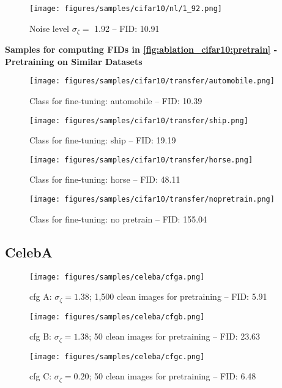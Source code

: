 \begin{figure}[h!]
    \centering
    \texttt{[image: figures/samples/cifar10/nl/1\_92.png]}
    \caption{Noise level $\sigma_\zeta = $ 1.92 -- FID: 10.91}
\end{figure}

\FloatBarrier

\textbf{Samples for computing FIDs in \cref{fig:ablation_cifar10:pretrain} - Pretraining on Similar Datasets}

\begin{figure}[h!]
    \centering
    \texttt{[image: figures/samples/cifar10/transfer/automobile.png]}
    \caption{Class for fine-tuning: automobile -- FID: 10.39}
\end{figure}

\begin{figure}[h!]
    \centering
    \texttt{[image: figures/samples/cifar10/transfer/ship.png]}
    \caption{Class for fine-tuning: ship -- FID: 19.19}
\end{figure}

\begin{figure}[h!]
    \centering
    \texttt{[image: figures/samples/cifar10/transfer/horse.png]}
    \caption{Class for fine-tuning: horse -- FID: 48.11}
\end{figure}
\newpage\begin{figure}[h!]
    \centering
    \texttt{[image: figures/samples/cifar10/transfer/nopretrain.png]}
    \caption{Class for fine-tuning: no pretrain -- FID: 155.04}
\end{figure}


\subsection{CelebA}

\begin{figure}[h!]
    \centering
    \texttt{[image: figures/samples/celeba/cfga.png]}
   \caption{cfg A: $\sigma_\zeta = 1.38$; 1,500 clean images for pretraining -- FID: 5.91}
\end{figure}

\begin{figure}[h!]
    \centering
    \texttt{[image: figures/samples/celeba/cfgb.png]}
   \caption{cfg B: $\sigma_\zeta = 1.38$; 50 clean images for pretraining -- FID: 23.63}
\end{figure}

\FloatBarrier

\begin{figure}[h!]
    \centering
    \texttt{[image: figures/samples/celeba/cfgc.png]}
   \caption{cfg C: $\sigma_\zeta = 0.20$; 50 clean images for pretraining -- FID: 6.48}
\end{figure}


\FloatBarrier
